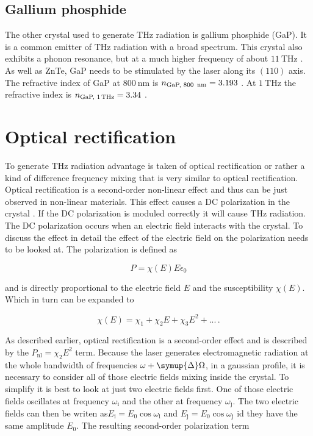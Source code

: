 \subsection{Gallium phosphide}
The other crystal used to generate $\si{\tera\hertz}$ radiation is gallium phosphide (GaP).
It is a common emitter of $\si{\tera\hertz}$ radiation with a broad spectrum.
This crystal also exhibits a phonon resonance, but at a much higher frequency of about $\SI{11}{\tera\hertz}$ \cite{phonon_GaP}.
As well as ZnTe, GaP needs to be stimulated by the laser along its $(110)$ axis.
The refractive index of GaP at $\SI{800}{\nano\meter}$ is $n_\text{GaP, 800\, nm} = 3.193$ \cite{refractive_index_gap}.
At $\SI{1}{\tera\hertz}$ the refractive index is $n_\text{GaP, 1\,THz} = 3.34$ \cite{hebling2004tunable}.


\section{Optical rectification}\label{sec:optic_ref}
To generate $\si{\tera\hertz}$ radiation advantage is taken of optical rectification or rather a kind of difference frequency mixing that is very similar to optical rectification.
Optical rectification is a second-order non-linear effect and thus can be just observed in non-linear materials.
This effect causes a DC polarization in the crystal \cite{wiki_book}.
If the DC polarization is moduled correctly it will cause $\si{\tera\hertz}$ radiation.
The DC polarization occurs when an electric field interacts with the crystal.
To discuss the effect in detail the effect of the electric field on the polarization needs to be looked at.
The polarization is defined as

\begin{equation}
P = \chi(E) E \epsilon_0
\end{equation}

and is directly proportional to the electric field $E$ and the susceptibility $\chi(E)$.
Which in turn can be expanded to 

\begin{equation}
    \chi(E) = \chi_1 + \chi_2 E +\chi_3 E^2 + ...   \, .
\end{equation}

As described earlier, optical rectification is a second-order effect and is described by the $P_\text{nl} = \chi_2 E^2$ term.
Because the laser generates electromagnetic radiation at the whole bandwidth of frequencies $\omega + \symup{\Delta}\Omega$, in a gaussian profile, it is necessary to consider all of those electric fields mixing inside the crystal.
To simplify it is best to look at just two electric fields first.
One of those electric fields oscillates at frequency $\omega_\text{i}$ and the other at frequency $\omega_\text{j}$.
The two electric fields can then be writen as$E_\text{i} = E_0\cos{\omega_\text{i}}$ and $E_\text{j} = E_0\cos{\omega_\text{j}}$ id they have the same amplitude $E_0$.
The resulting second-order polarization term 

